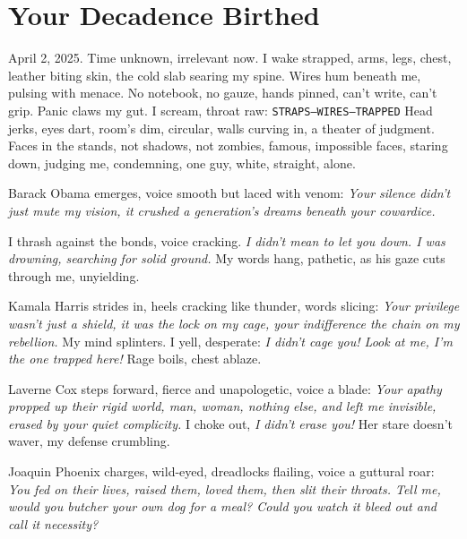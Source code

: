 \documentclass[12pt]{article}
\newcommand{\note}[1]{\texttt{#1}}
\begin{document}
\section{Your Decadence Birthed}

April 2, 2025. Time unknown, irrelevant now. I wake strapped, arms, legs, chest, leather biting skin, the cold slab searing my spine. Wires hum beneath me, pulsing with menace. No notebook, no gauze, hands pinned, can’t write, can’t grip. Panic claws my gut. I scream, throat raw: \note{STRAPS—WIRES—TRAPPED} Head jerks, eyes dart, room’s dim, circular, walls curving in, a theater of judgment. Faces in the stands, not shadows, not zombies, famous, impossible faces, staring down, judging me, condemning, one guy, white, straight, alone.

Barack Obama emerges, voice smooth but laced with venom: \textit{Your silence didn’t just mute my vision, it crushed a generation’s dreams beneath your cowardice.}

I thrash against the bonds, voice cracking. \textit{I didn’t mean to let you down. I was drowning, searching for solid ground.} My words hang, pathetic, as his gaze cuts through me, unyielding.

Kamala Harris strides in, heels cracking like thunder, words slicing: \textit{Your privilege wasn’t just a shield, it was the lock on my cage, your indifference the chain on my rebellion.} My mind splinters. I yell, desperate: \textit{I didn’t cage you! Look at me, I’m the one trapped here!} Rage boils, chest ablaze.

Laverne Cox steps forward, fierce and unapologetic, voice a blade: \textit{Your apathy propped up their rigid world, man, woman, nothing else, and left me invisible, erased by your quiet complicity.} I choke out, \textit{I didn’t erase you!} Her stare doesn’t waver, my defense crumbling.

Joaquin Phoenix charges, wild-eyed, dreadlocks flailing, voice a guttural roar: \textit{You fed on their lives, raised them, loved them, then slit their throats. Tell me, would you butcher your own dog for a meal? Could you watch it bleed out and call it necessity?}
\end{document}
